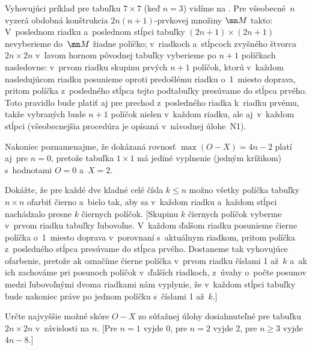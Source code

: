 {Vyhovujúci príklad pre tabuľku $7\times 7$ (keď $n=3$) vidíme na
\obr. Pre všeobecné~$n$ vyzerá obdobná konštrukcia $2n(n+1)$-prvkovej
množiny $\mn M$ takto: V~poslednom riadku a~poslednom stĺpci tabuľky
$(2n+1)\times (2n+1)$ nevyberieme do~$\mn M$ žiadne políčko; v~riadkoch
a~stĺpcoch zvyšného štvorca $2n\times2n$ v~ľavom hornom 
pôvodnej tabuľky vyberieme po $n+1$ políčkach nasledovne: v~prvom
riadku skupinu prvých ${n+1}$ políčok, ktorú v~každom nasledujúcom
riadku posunieme oproti predošlému riadku o~1~miesto doprava,
pritom políčka z~posledného stĺpca tejto podtabuľky presúvame do stĺpca
prvého. Toto pravidlo bude platiť aj pre prechod z~posledného riadka
k~riadku prvému, takže vybraných bude $n+1$ políčok nielen v~každom riadku, ale
aj~v~každom stĺpci (všeobecnejšia procedúra je opísaná v~návodnej úlohe~N1).
%

Nakoniec poznamenajme, že dokázaná rovnosť $\max(O-X)=4n-2$ platí
aj~pre $n=0$, pretože tabuľka $1\times 1$ má jediné vyplnenie (jedným
krížikom) s~hodnotami $O=0$ a~$X=2$.


Dokážte, že pre každé dve kladné celé čísla $k\le n$ možno
všetky políčka tabuľky ${n\times n}$ ofarbiť čierno a~bielo tak, aby sa
v~každom riadku a~každom stĺpci nachádzalo presne $k$ čiernych políčok.
[Skupinu $k$ čiernych políčok vyberme v~prvom riadku tabuľky ľubovoľne.
V~každom ďalšom riadku posunieme čierne políčka o~1~miesto doprava v~porovnaní s~aktuálnym riadkom, pritom políčka z~posledného stĺpca
presúvame do stĺpca prvého. Dostaneme tak vyhovujúce ofarbenie, pretože
ak označíme čierne políčka v~prvom riadku číslami 1 až~$k$ a~ak ich zachováme pri posunoch políčok v~ďalších riadkoch, z~úvahy o~počte posunov medzi
ľubovoľnými dvoma riadkami nám vyplynie, že v~každom stĺpci tabuľky bude
nakoniec práve po jednom políčku s~číslami 1 až~$k$.]

\D
Určte najvyššie možné skóre $O-X$ zo súťažnej úlohy dosiahnuteľné pre tabuľku $2n\times
2n$ v~závislosti na $n$. [Pre $n=1$ vyjde 0, pre $n=2$ vyjde 2, pre $n\ge 3$ vyjde $4n-8$.]
}

